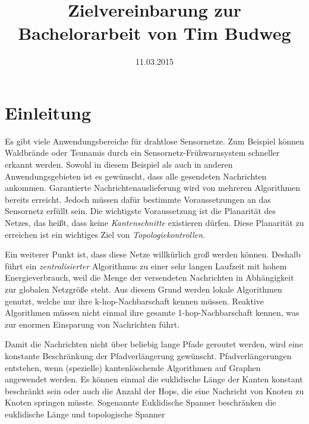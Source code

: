 \documentclass[a4paper,DIV10,10pt,headsepline,smallheadings]{scrreprt}
\title{Zielvereinbarung zur Bachelorarbeit von Tim Budweg}
\author{}
\date{11.03.2015}
\begin{document}
\maketitle

\section{Einleitung}
Es gibt viele Anwendungsbereiche für drahtlose Sensornetze. 
Zum Beispiel können Waldbrände oder Tsunamis durch ein Sensornetz-Frühwarnsystem schneller erkannt werden. 
Sowohl in diesem Beispiel als auch in anderen Anwendungsgebieten ist es gewünscht, dass alle gesendeten Nachrichten ankommen.
Garantierte Nachrichtenauslieferung wird von mehreren Algorithmen bereits erreicht.
Jedoch müssen dafür bestimmte Voraussetzungen an das Sensornetz erfüllt sein. 
Die wichtigste Voraussetzung ist die Planarität des Netzes, das heißt, dass keine \emph{Kantenschnitte} existieren dürfen. 
Diese Planarität zu erreichen ist ein wichtiges Ziel von \emph{Topologiekontrollen}.

Ein weiterer Punkt ist, dass diese Netze willkürlich groß werden können.
Deshalb führt ein \emph{zentralisierter} Algorithmus zu einer sehr langen Laufzeit mit hohem Energieverbrauch, weil die Menge der versendeten Nachrichten in Abhängigkeit zur globalen Netzgröße steht.
Aus diesem Grund werden lokale Algorithmen genutzt, welche nur ihre k-hop-Nachbarschaft kennen müssen.
Reaktive Algorithmen müssen nicht einmal ihre gesamte 1-hop-Nachbarschaft kennen, was zur enormen Einsparung von Nachrichten führt.

Damit die Nachrichten nicht über beliebig lange Pfade geroutet werden, wird eine konstante Beschränkung der Pfadverlängerung gewünscht. 
Pfadverlängerungen entstehen, wenn (spezielle) kantenlöschende Algorithmen auf Graphen angewendet werden.
Es können einmal die euklidische Länge der Kanten konstant beschränkt sein oder auch die Anzahl der Hops, die eine Nachricht von Knoten zu Knoten springen müsste.
Sogenannte Euklidische Spanner beschränken die euklidische Länge und topologische Spanner 
\end{document}
